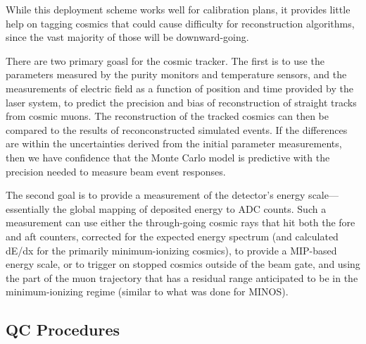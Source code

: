	While this deployment scheme works well for calibration plans, it
provides little help on tagging cosmics that could cause difficulty for
reconstruction algorithms, since the vast majority of those will be
downward-going.  

	There are two primary goasl for the cosmic tracker. The first is to use
the parameters measured by the purity monitors and temperature sensors, and the
measurements of electric field as a function of position and time provided by
the laser system, to predict the precision and bias of reconstruction of
straight tracks from cosmic muons. The reconstruction of the tracked cosmics
can then be compared to the results of reconconstructed simulated events. If
the differences are within the uncertainties derived from the initial parameter
measurements, then we have confidence that the Monte Carlo model is predictive
with the precision needed to measure beam event responses.  

	The second goal is to provide a measurement of the detector's energy
scale---essentially the global mapping of deposited energy to ADC counts.  Such
a measurement can use either the through-going cosmic rays that hit both the
fore and aft counters, corrected for the expected energy spectrum (and
calculated dE/dx for the primarily minimum-ionizing cosmics), to provide a
MIP-based energy scale, or to trigger on stopped cosmics outside of the beam
gate, and using the part of the muon trajectory that has a residual range
anticipated to be in the minimum-ionizing regime (similar to what was done for
MINOS).  
	
\subsection{QC Procedures}

